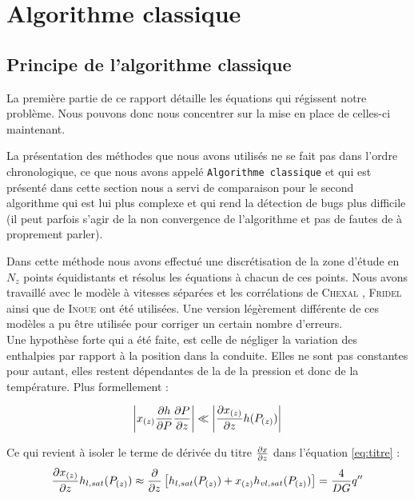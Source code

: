\section{Algorithme classique\label{section:algo_clas}}

\subsection{Principe de l'algorithme classique}

La première partie de ce rapport détaille les équations qui régissent notre problème. Nous pouvons donc nous concentrer sur la mise en place de celles-ci maintenant.\\ \par 
La présentation des méthodes que nous avons utilisés ne se fait pas dans l'ordre chronologique, ce que nous avons appelé \texttt{Algorithme classique} et qui est présenté dans cette section nous a servi de comparaison pour le second algorithme qui est lui plus complexe et qui rend la détection de bugs plus difficile (il peut parfois s'agir de la non convergence de l'algorithme et pas de fautes de à proprement parler).\\ \par
Dans cette méthode nous avons effectué une discrétisation de la zone d'étude en $N_z$ points équidistants et résolus les équations à chacun de ces points. Nous avons travaillé avec le modèle à vitesses séparées et les corrélations de \textsc{Chexal} \cite{chexalFullrangeDriftfluxCorrelation1986}, \textsc{Fridel} \cite{freidelImprovedFrictionPressure1979a} ainsi que de \textsc{Inoue} \cite{inoueInbundleVoidMeasurement1993} ont été utilisées. Une version légèrement différente de ces modèles \cite{revellinAdiabaticTwophaseFrictional2007} a pu être utilisée pour corriger un certain nombre d'erreurs. \\

Une hypothèse forte qui a été faite, est celle de négliger la variation des enthalpies par rapport à la position dans la conduite. Elles ne sont pas constantes pour autant, elles restent dépendantes de la de la pression et donc de la température. Plus formellement :

\begin{equation}
    \left| x_{(z)}\pder[h]{P}\pder[P]{z} \right| \ll \left|\pder[x_{(z)}]{z}h(P_{(z)}) \right|
\end{equation}

Ce qui revient à isoler le terme de dérivée du titre $\pder[x]{z}$ dans l'équation \ref{eq:titre} :
\begin{equation}
     \pder[x_{(z)}]{z}h_{l,sat}(P_{(z)}) \approx \pder{z} \left[ h_{l,sat}(P_{(z)})+x_{(z)}h_{vl,sat}(P_{(z)})\right]  = \frac{4}{DG}q''
\label{eq:titreapprox}
\end{equation}


